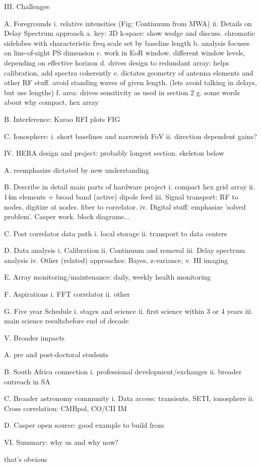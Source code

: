 III. Challenges 

A. Foregrounds
i. relative intensities (Fig: Continuum from MWA)
ii. Details on Delay Spectrum approach
a. key: 3D k-space: show wedge and discuss. chromatic sidelobes with characteristic freq scale 
set by baseline length
b. analysis focuses on line-of-sight PS dimension
c. work in EoR window.  different window levels, depending on effective horizon
d. drives design to redundant array: helps calibration, add spectra coherently
e. dictates geometry of antenna elements and other RF stuff. avoid standing waves of given length. 
(lets avoid talking in delays, but use lengths)
f. area: drives sensitivity as used in section 2
g. some words about why compact, hex array 

B. Interference: Karoo RFI plots  FIG

C. Ionosphere: 
i. short baselines and narrowish FoV
ii. direction dependent gains?


IV. HERA design and project: probably longest section. skeleton below

A. reemphasize dictated by new understanding

B. Describe in detail main parts of hardware project
i. compact hex grid array
ii. 14m elements + broad band (active) dipole feed
iii. Signal transport: RF to nodes, digitize at nodes. fiber to correlator. 
iv. Digital stuff: emphasize 'solved problem'. Casper work. block diagrams...

C. Post correlator data path
i. local storage
ii. transport to data centers

D. Data analysis
i. Calibration 
ii. Continuum and removal
iii. Delay spectrum analysis
iv. Other (related) approaches: Bayes, z-variance,
v. HI imaging

E. Array monitoring/maintenance: daily, weekly health monitoring

F. Aspirations
i. FFT correlator
ii. other

G. Five year Schedule
i. stages and science
ii. first science within 3 or 4 years
iii. main science resultsbefore end of decade


V. Broader impacts

A. pre and post-doctoral students

B. South Africa connection
i. professional development/exchanges
ii. broader outreach in SA

C. Broader astronomy community
i. Data access: transients, SETI, ionosphere
ii. Cross correlation: CMBpol, CO/CII IM

D. Casper open source: good example to build from


VI. Summary: why us and why now?

that's obvious










